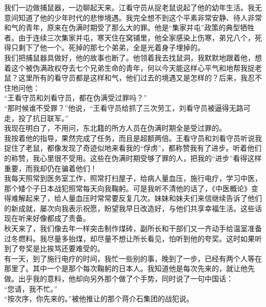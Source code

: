 我们一边做捕鼠器，一边聊起天来。江看守员从捉老鼠说起了他的幼年生活。我无意间知道了他的少年时代的悲惨境遇。我完全想不到这个平素非常安静、待人非常和气的青年，原来在伪满时期受了那么大的罪。他是“集家并屯”政策的典型牺牲者。由于连续三次集家并屯，寒天住在窝铺里，他全家感染上伤寒，弟兄八个，死得只剩下了他一个。死掉的那七个弟弟，全是光着身子埋掉的。\\

我们把捕鼠器具做好，他的故事也断了。他领着我去找鼠洞，我默默地跟着他，想着这个被伪满政权夺去七个兄弟生命的青年，何以今天能这样心平气和地帮我捉老鼠？这里所有的看守员都是这样和气，他们过去的境遇又是怎样的？后来，我忍不住地问他：\\

“王看守员和刘看守员，都在伪满受过罪吗？”\\

“那时候谁不受罪？”他说，“王看守员给抓了三次劳工，刘看守员被逼得无路可走，投了抗日联军。”\\

我现在明白了，不用问，东北籍的所方人员在伪满时期全是受过罪的。\\

我按着他的指导，果然完成了任务，而且是超额两倍。王看守员和刘看守员听说我捉住了老鼠，都像发现了奇迹似地来看我的“俘虏”，都称赞我有了进步。听着他们的称赞，我心里很不受用。这些在伪满时期受够了罪的人，把我的“进步”看得这样重要，而我却仍在骗着他们！\\

我每天照常到医务室工作，照常打扫屋子，给病人量血压，施行电疗，学习中医，那个矮个子日本战犯照常每天向我鞠躬。可是我听不清他的话了，《中医概论》变得难解起来了，给人量血压时常常要反复几次。妹妹和妹夫们来信继续告诉了他们的新成就，屡次向我表示祝愿，盼望我早日改造好，与他们共享幸福生活。这些话现在听来好像都成了责备。\\

秋天来了，我们像去年一样突击制作煤砖，副所长和干部们又一齐动手给温室准备过冬燃料。我尽量多抬煤，却尽量不想让所长看见，怕听到他的夸奖。这时如果听到了夸奖是比挨骂还要难受的。\\

有一天，到了施行电疗的时间，我忙一些别的事，晚到了一步，已经有两个人等在那里了。其中一个是那个每次鞠躬的日本人。我知道他是每次先来的，就让他先做。出乎我的意料，他却向另外那个做了个手势，同时说了一句中国话：\\

“您请，我不忙。”\\

“按次序，你先来的。”被他推让的那个蒋介石集团的战犯说。\\

